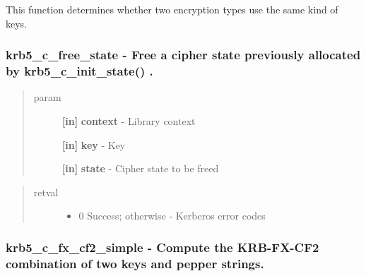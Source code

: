 \documentclass[letterpaper,10pt,english]{sphinxmanual}
\begin{document}
This function determines whether two encryption types use the same kind of keys.


\subsubsection{krb5\_c\_free\_state -  Free a cipher state previously allocated by krb5\_c\_init\_state() .}
\label{appdev/refs/api/krb5_c_free_state:krb5-c-free-state-free-a-cipher-state-previously-allocated-by-krb5-c-init-state}\label{appdev/refs/api/krb5_c_free_state::doc}

\begin{fulllineitems}
\label{appdev/refs/api/krb5_c_free_state:c.krb5_c_free_state}
\end{fulllineitems}

\begin{quote}\begin{description}
\item[{param}] \leavevmode
\textbf{{[}in{]}} \textbf{context} - Library context

\textbf{{[}in{]}} \textbf{key} - Key

\textbf{{[}in{]}} \textbf{state} - Cipher state to be freed

\end{description}\end{quote}
\begin{quote}\begin{description}
\item[{retval}] \leavevmode\begin{itemize}
\item {} 
0   Success; otherwise - Kerberos error codes

\end{itemize}

\end{description}\end{quote}


\subsubsection{krb5\_c\_fx\_cf2\_simple -  Compute the KRB-FX-CF2 combination of two keys and pepper strings.}
\label{appdev/refs/api/krb5_c_fx_cf2_simple:krb5-c-fx-cf2-simple-compute-the-krb-fx-cf2-combination-of-two-keys-and-pepper-strings}\label{appdev/refs/api/krb5_c_fx_cf2_simple::doc}
\end{document}

